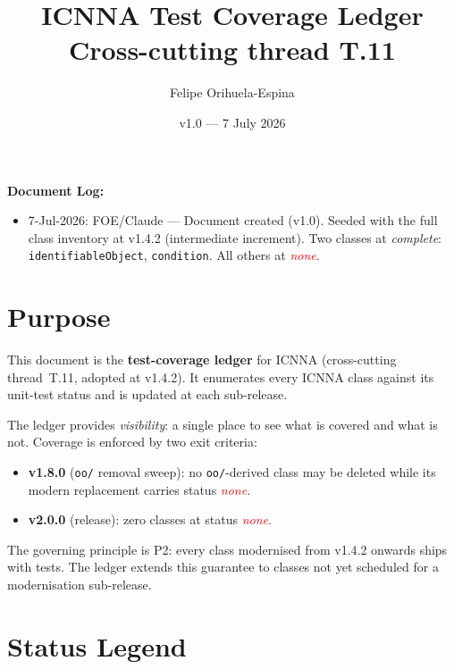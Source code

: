 \documentclass[11pt,a4paper]{article}
\title{ICNNA Test Coverage Ledger\\[0.5ex]
       \large Cross-cutting thread T.11}
\author{Felipe Orihuela-Espina}
\date{v1.0 --- 7 July 2026}
\newcommand{\statusNone}{\textcolor{red}{\textit{none}}}
\newcommand{\statusComplete}{\textcolor{green!60!black}{\textit{complete}}}
\begin{document}
\maketitle

\noindent\textbf{Document Log:}
\begin{itemize}[nosep]
    \item 7-Jul-2026: FOE/Claude --- Document created (v1.0). Seeded
          with the full class inventory at v1.4.2 (intermediate increment).
          Two classes at \statusComplete: \texttt{identifiableObject},
          \texttt{condition}. All others at \statusNone.
\end{itemize}

\bigskip

\section*{Purpose}

This document is the \textbf{test-coverage ledger} for ICNNA (cross-cutting
thread~T.11, adopted at v1.4.2). It enumerates every ICNNA class against its
unit-test status and is updated at each sub-release.

The ledger provides \emph{visibility}: a single place to see what is covered
and what is not. Coverage is enforced by two exit criteria:

\begin{itemize}
    \item \textbf{v1.8.0} (\texttt{oo/} removal sweep): no \texttt{oo/}-derived
          class may be deleted while its modern replacement carries status
          \statusNone.
    \item \textbf{v2.0.0} (release): zero classes at status \statusNone.
\end{itemize}

The governing principle is P2: every class modernised from v1.4.2 onwards
ships with tests. The ledger extends this guarantee to classes not yet
scheduled for a modernisation sub-release.

\section*{Status Legend}
\end{document}
